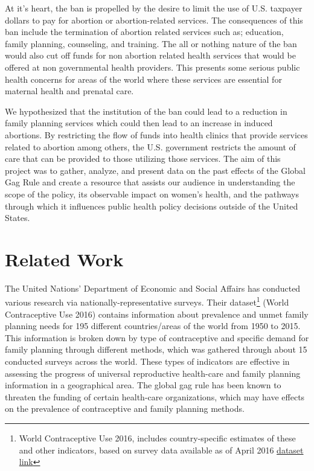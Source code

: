 \documentclass[11pt,]{article}
\begin{document}
At it's heart, the ban is propelled by the desire to limit the use of
U.S. taxpayer dollars to pay for abortion or abortion-related services.
The consequences of this ban include the termination of abortion related
services such as; education, family planning, counseling, and training.
The all or nothing nature of the ban would also cut off funds for non
abortion related health services that would be offered at non
governmental health providers. This presents some serious public health
concerns for areas of the world where these services are essential for
maternal health and prenatal care.

We hypothesized that the institution of the ban could lead to a
reduction in family planning services which could then lead to an
increase in induced abortions. By restricting the flow of funds into
health clinics that provide services related to abortion among others,
the U.S. government restricts the amount of care that can be provided to
those utilizing those services. The aim of this project was to gather,
analyze, and present data on the past effects of the Global Gag Rule and
create a resource that assists our audience in understanding the scope
of the policy, its observable impact on women's health, and the pathways
through which it influences public health policy decisions outside of
the United States.

\section{Related Work}\label{related-work}

The United Nations' Department of Economic and Social Affairs has
conducted various research via nationally-representative surveys. Their
dataset\footnote{World Contraceptive Use 2016, includes country-specific
  estimates of these and other indicators, based on survey data
  available as of April 2016
  \href{http://www.un.org/en/development/desa/population/publications/dataset/contraception/wcu2016.shtml}{dataset
  link}} (World Contraceptive Use 2016) contains information about
prevalence and unmet family planning needs for 195 different
countries/areas of the world from 1950 to 2015. This information is
broken down by type of contraceptive and specific demand for family
planning through different methods, which was gathered through about 15
conducted surveys across the world. These types of indicators are
effective in assessing the progress of universal reproductive
health-care and family planning information in a geographical area. The
global gag rule has been known to threaten the funding of certain
health-care organizations, which may have effects on the prevalence of
contraceptive and family planning methods.
\end{document}
